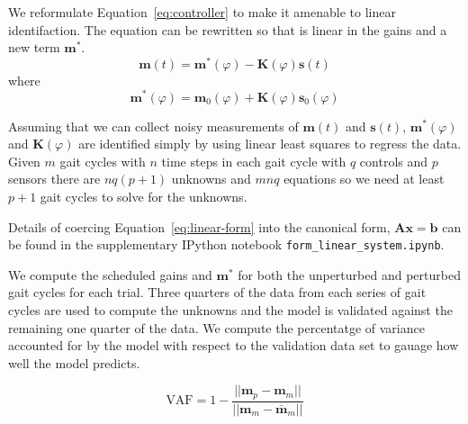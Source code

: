 \documentclass{article}
\begin{document}

We reformulate Equation~\ref{eq:controller} to make it amenable to linear
identifaction. The equation can be rewritten so that is linear in the gains and
a new term $\mathbf{m}^*$.
%
\begin{equation}
  \mathbf{m}(t) = \mathbf{m}^*(\varphi) - \mathbf{K}(\varphi) \mathbf{s}(t)
  \label{eq:linear-form}
\end{equation}
%
where
%
\begin{equation}
  \mathbf{m}^*(\varphi) = \mathbf{m}_0(\varphi) + \mathbf{K}(\varphi) \mathbf{s}_0(\varphi)
\end{equation}

Assuming that we can collect noisy measurements of $\mathbf{m}(t)$
and $\mathbf{s}(t)$, $\mathbf{m}^*(\varphi)$ and $\mathbf{K}(\varphi)$ are
identified simply by using linear least squares to regress the data. Given $m$
gait cycles with $n$ time steps in each gait cycle with $q$ controls and $p$
sensors there are $nq(p + 1)$ unknowns and $mnq$ equations so we need at least
$p + 1$ gait cycles to solve for the unknowns.

Details of coercing Equation~\ref{eq:linear-form} into the canonical form,
$\mathbf{Ax}=\mathbf{b}$ can be found in the supplementary IPython notebook
\verb|form_linear_system.ipynb|.

We compute the scheduled gains and $\mathbf{m}^*$ for both the unperturbed and
perturbed gait cycles for each trial. Three quarters of the data from each
series of gait cycles are used to compute the unknowns and the model is
validated against the remaining one quarter of the data. We compute the
percentatge of variance accounted for by the model with respect to the
validation data set to gauage how well the model predicts.

\begin{equation}
  \textrm{VAF} = 1 - \frac{||\mathbf{m}_p - \mathbf{m}_m||}
    {||\mathbf{m}_m - \bar{\mathbf{m}}_m||}
  \label{eq:vaf}
\end{equation}
\end{document}
